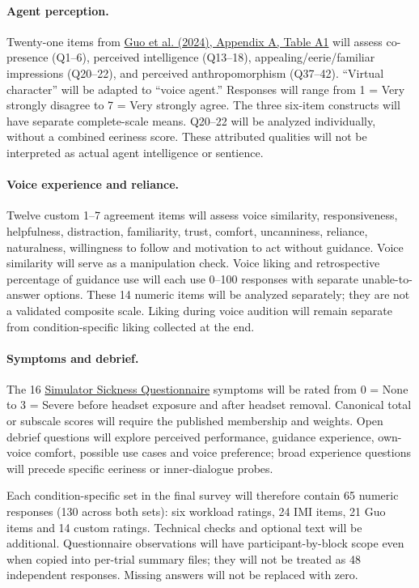 \documentclass[11pt,letterpaper]{article}
\begin{document}
\paragraph{Agent perception.} Twenty-one items from \href{https://doi.org/10.1145/3651288}{Guo et al. (2024), Appendix A, Table A1} will assess co-presence (Q1--6), perceived intelligence (Q13--18), appealing/eerie/familiar impressions (Q20--22), and perceived anthropomorphism (Q37--42). ``Virtual character'' will be adapted to ``voice agent.'' Responses will range from 1 = Very strongly disagree to 7 = Very strongly agree. The three six-item constructs will have separate complete-scale means. Q20--22 will be analyzed individually, without a combined eeriness score. These attributed qualities will not be interpreted as actual agent intelligence or sentience.

\paragraph{Voice experience and reliance.} Twelve custom 1--7 agreement items will assess voice similarity, responsiveness, helpfulness, distraction, familiarity, trust, comfort, uncanniness, reliance, naturalness, willingness to follow and motivation to act without guidance. Voice similarity will serve as a manipulation check. Voice liking and retrospective percentage of guidance use will each use 0--100 responses with separate unable-to-answer options. These 14 numeric items will be analyzed separately; they are not a validated composite scale. Liking during voice audition will remain separate from condition-specific liking collected at the end.

\paragraph{Symptoms and debrief.} The 16 \href{https://doi.org/10.1207/s15327108ijap0303_3}{Simulator Sickness Questionnaire} symptoms will be rated from 0 = None to 3 = Severe before headset exposure and after headset removal. Canonical total or subscale scores will require the published membership and weights. Open debrief questions will explore perceived performance, guidance experience, own-voice comfort, possible use cases and voice preference; broad experience questions will precede specific eeriness or inner-dialogue probes.

Each condition-specific set in the final survey will therefore contain 65 numeric responses (130 across both sets): six workload ratings, 24 IMI items, 21 Guo items and 14 custom ratings. Technical checks and optional text will be additional. Questionnaire observations will have participant-by-block scope even when copied into per-trial summary files; they will not be treated as 48 independent responses. Missing answers will not be replaced with zero.
\end{document}
